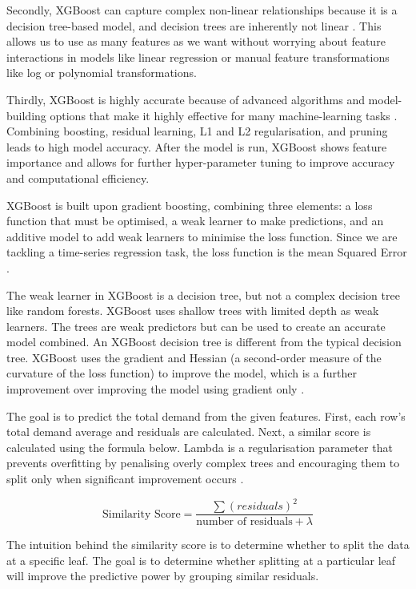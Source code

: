 \documentclass[mstat,12pt]{unswthesis}
\begin{document}
Secondly, XGBoost can capture complex non-linear relationships because
it is a decision tree-based model, and decision trees are inherently not
linear \cite{ambika_2023_xgboost}. This allows us to use as many
features as we want without worrying about feature interactions in
models like linear regression or manual feature transformations like log
or polynomial transformations.

Thirdly, XGBoost is highly accurate because of advanced algorithms and
model-building options that make it highly effective for many
machine-learning tasks \cite{ambika_2023_xgboost}. Combining boosting,
residual learning, L1 and L2 regularisation, and pruning leads to high
model accuracy. After the model is run, XGBoost shows feature importance
and allows for further hyper-parameter tuning to improve accuracy and
computational efficiency.

XGBoost is built upon gradient boosting, combining three elements: a
loss function that must be optimised, a weak learner to make
predictions, and an additive model to add weak learners to minimise the
loss function. Since we are tackling a time-series regression task, the
loss function is the mean Squared Error
\cite{brownlee_gradientboosting2020}.

The weak learner in XGBoost is a decision tree, but not a complex
decision tree like random forests. XGBoost uses shallow trees with
limited depth as weak learners. The trees are weak predictors but can be
used to create an accurate model combined. An XGBoost decision tree is
different from the typical decision tree. XGBoost uses the gradient and
Hessian (a second-order measure of the curvature of the loss function)
to improve the model, which is a further improvement over improving the
model using gradient only \cite{chen_2016_xgboost}.

The goal is to predict the total demand from the given features. First,
each row's total demand average and residuals are calculated. Next, a
similar score is calculated using the formula below. Lambda is a
regularisation parameter that prevents overfitting by penalising overly
complex trees and encouraging them to split only when significant
improvement occurs \cite{chen_2016_xgboost}.

\[
\text{Similarity Score} = \frac{\sum{(residuals)}^2 }{\text{number of residuals} + \lambda}
\]

The intuition behind the similarity score is to determine whether to
split the data at a specific leaf. The goal is to determine whether
splitting at a particular leaf will improve the predictive power by
grouping similar residuals.
\end{document}
